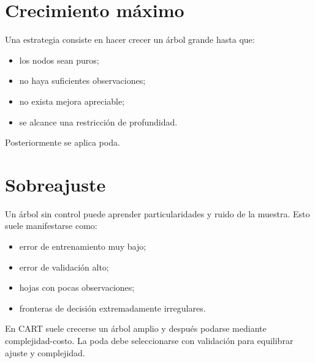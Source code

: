 \documentclass[
  spanish,
  10.5pt,
  letterpaper,
  DIV=11,
  numbers=noendperiod,
  oneside,
  open=any]{scrreprt}
\providecommand{\tightlist}{%
  \setlength{\itemsep}{0pt}\setlength{\parskip}{0pt}}
\theoremstyle{definition}
\theoremstyle{definition}
\theoremstyle{plain}
\theoremstyle{remark}
\begin{document}
\section*{Crecimiento máximo}\label{crecimiento-muxe1ximo}


Una estrategia consiste en hacer crecer un árbol grande hasta que:

\begin{itemize}
\tightlist
\item
  los nodos sean puros;
\item
  no haya suficientes observaciones;
\item
  no exista mejora apreciable;
\item
  se alcance una restricción de profundidad.
\end{itemize}

Posteriormente se aplica poda.

\section*{Sobreajuste}\label{sobreajuste-1}


Un árbol sin control puede aprender particularidades y ruido de la
muestra. Esto suele manifestarse como:

\begin{itemize}
\tightlist
\item
  error de entrenamiento muy bajo;
\item
  error de validación alto;
\item
  hojas con pocas observaciones;
\item
  fronteras de decisión extremadamente irregulares.
\end{itemize}

\begin{tcolorbox}[enhanced jigsaw, arc=.35mm, bottomrule=.15mm, bottomtitle=1mm, breakable, colback=white, colbacktitle=quarto-callout-important-color!10!white, colframe=quarto-callout-important-color-frame, coltitle=black, left=2mm, leftrule=.75mm, opacityback=0, opacitybacktitle=0.6, rightrule=.15mm, title=\textcolor{quarto-callout-important-color}{\faExclamation}\hspace{0.5em}{Crecimiento y poda}, titlerule=0mm, toprule=.15mm, toptitle=1mm]

En CART suele crecerse un árbol amplio y después podarse mediante
complejidad-costo. La poda debe seleccionarse con validación para
equilibrar ajuste y complejidad.

\end{tcolorbox}
\end{document}
